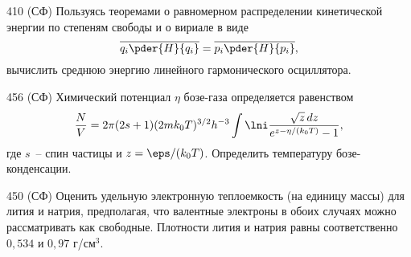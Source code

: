 \documentclass[pscyr]{hedwork}
\begin{document}
  \begin{task}{410 (СФ)}{
    Пользуясь теоремами о равномерном распределении кинетической энергии по
    степеням свободы и о вириале в виде
    \[
      \overline{q_i\pder{H}{q_i}} = \overline{p_i\pder{H}{p_i}},
    \]
    вычислить среднюю энергию линейного гармонического осциллятора.
  }

  \end{task}

  \begin{task}{456 (СФ)}{
    Химический потенциал \( \eta \) бозе-газа определяется равенством
    \[
      \frac{N}{V} = 2\pi(2s + 1)(2mk_0 T)^{3/2} h^{-3}
        \int\lni \frac{\sqrt{z}\,dz}{e^{z - \eta / (k_0 T)} - 1},
    \]
    где \( s \)~-- спин частицы и \( z = \eps / (k_0 T) \). Определить
    температуру бозе-конденсации.
  }

  \end{task}

  \begin{task*}{450 (СФ)}{
    Оценить удельную электронную теплоемкость (на единицу массы) для лития и
    натрия, предполагая, что валентные электроны в обоих случаях можно
    рассматривать как свободные. Плотности лития и натрия равны соответственно
    \( 0,\!534 \) и \( 0,\!97 \) г/см\( ^3 \).
  }

  \end{task*}
\end{document}
